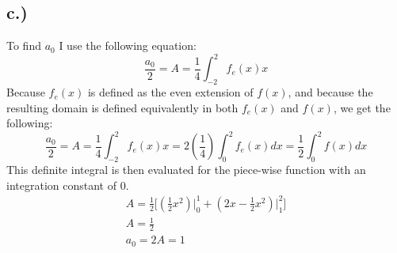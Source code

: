 \documentclass{article}
\begin{document}
\subsection*{c.)}
To find $a_0$ I use the following equation:
\begin{equation}
\frac{a_0}{2} = A = \frac{1}{4}\int_{-2}^2 f_e(x)x
\end{equation}
Because $f_e(x)$ is defined as the even extension of $f(x)$, and because the resulting domain is defined equivalently in both $f_e(x)$ and $f(x)$, we get the following:
\begin{equation}
\frac{a_0}{2} = A = \frac{1}{4}\int_{-2}^2 f_e(x)x = 2(\frac{1}{4})\int_0^2 f_e(x)dx = \frac{1}{2}\int_0^2f(x)dx
\end{equation}
This definite integral is then evaluated for the piece-wise function with an integration constant of 0.
\begin{equation}
\begin{aligned}
A = \frac{1}{2}\Big[(\frac{1}{2}x^2) \Big|_0^1 + (2x-\frac{1}{2}x^2)\Big|_1^2\Big]\\
A = \frac{1}{2}\\
a_0 = 2A = 1
\end{aligned}
\end{equation}
\end{document}
